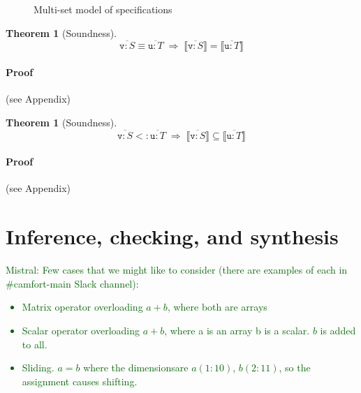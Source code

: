 \documentclass[9pt]{sigplanconf}
\newcommand{\mnote}[1]{\textcolor{darkgreen}{Mistral: #1}}
\newcounter{block}
\theoremstyle{definition}
\newtheorem{theorem}[block]{Theorem}
\newcommand{\interp}[1]{\llbracket{#1}\rrbracket}
\begin{document}

\begin{figure}

\caption{Multi-set model of specifications}
\label{fig:model}
\end{figure}

\begin{theorem}[Soundness]
\[
\overline{\texttt{v} : S}\equiv \overline{\texttt{u} : T}
\; \Rightarrow \;
\interp{\overline{\texttt{v} : S}} = \interp{\overline{\texttt{u} : T}}
\]
\end{theorem}

\paragraph{Proof} (see Appendix)

\begin{theorem}[Soundness]
\[
\overline{\texttt{v} : S} <: \overline{\texttt{u} : T}
\; \Rightarrow \;
\interp{\overline{\texttt{v} : S}} \subseteq \interp{\overline{\texttt{u} : T}}
\]
\end{theorem}

\paragraph{Proof} (see Appendix)



\section{Inference, checking, and synthesis}
\label{sec:analysis}

\mnote{Few cases that we might like to consider (there are examples
    of each in \#camfort-main Slack channel):
  \begin{itemize}
    \item Matrix operator overloading $a + b$, where both are arrays
    \item Scalar operator overloading $a + b$, where a is an array b is a
      scalar. $b$ is added to all.
    \item Sliding. $a = b$ where the dimensionsare $a(1:10)$, $b(2:11)$,
      so the assignment causes shifting.
  \end{itemize}
}
\end{document}
